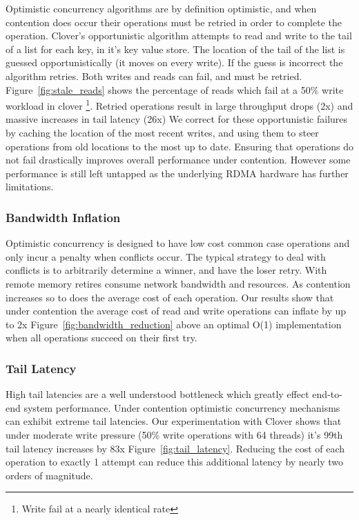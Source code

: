 Optimistic concurrency algorithms are by definition optimistic, and when
contention does occur their operations must be retried in order to complete the
operation. Clover's opportunistic algorithm attempts to read and write to the
tail of a list for each key, in it's key value store. The location of the tail
of the list is guessed opportunistically (it moves on every write). If the guess
is incorrect the algorithm retries. Both writes and reads can fail, and must be
retried. Figure~\ref{fig:stale_reads} shows the percentage of reads which fail
at a 50\% write workload in clover \footnote{Write fail at a nearly identical
rate}. Retried operations result in large throughput drops (2x) and massive
increases in tail latency (26x) We correct for these opportunistic failures by
caching the location of the most recent writes, and using them to steer
operations from old locations to the most up to date. Ensuring that operations
do not fail drastically improves overall performance under contention. However
some performance is still left untapped as the underlying RDMA hardware has
further limitations. 

\subsubsection{Bandwidth Inflation} 

Optimistic concurrency is designed to have low cost common case operations and
only incur a penalty when conflicts occur. The typical strategy to deal with
conflicts is to arbitrarily determine a winner, and have the loser retry. With
remote memory retires consume network bandwidth and resources. As contention
increases so to does the average cost of each operation. Our results show that
under contention the average cost of read and write operations can inflate by up
to 2x Figure~\ref{fig:bandwidth_reduction} above an optimal O(1) implementation when
all operations succeed on their first try.

\subsubsection{Tail Latency}

High tail latencies are a well understood bottleneck which greatly effect
end-to-end system performance. Under contention optimistic concurrency
mechanisms can exhibit extreme tail latencies. Our experimentation with Clover
shows that under moderate write pressure (50\% write operations with 64 threads)
it's 99th tail latency increases by 83x Figure~\ref{fig:tail_latency}. Reducing the
cost of each operation to exactly 1 attempt can reduce this additional latency
by nearly two orders of magnitude.








